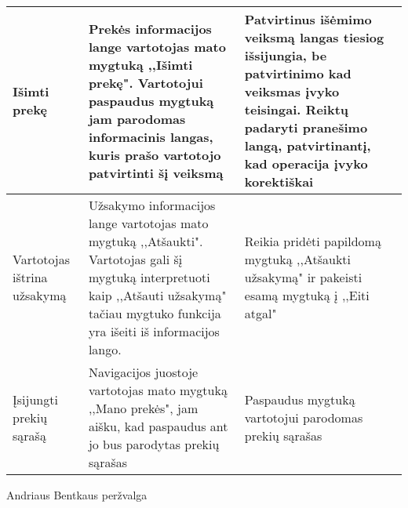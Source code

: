 \documentclass[oneside]{VUMIFPSkursinis}
\begin{document}
\begin{center}
    \begin{tabular}{ |p{4cm}| p{6cm} | p{7cm} | }
    \hline

	Išimti prekę & Prekės informacijos lange vartotojas mato mygtuką ,,Išimti prekę". Vartotojui paspaudus mygtuką jam parodomas informacinis langas, kuris prašo vartotojo patvirtinti šį veiksmą & Patvirtinus išėmimo veiksmą langas tiesiog išsijungia, be patvirtinimo kad veiksmas įvyko teisingai. Reiktų padaryti pranešimo langą, patvirtinantį, kad operacija įvyko korektiškai \\ \hline
	Vartotojas ištrina užsakymą & Užsakymo informacijos lange vartotojas mato mygtuką ,,Atšaukti". Vartotojas gali šį mygtuką interpretuoti kaip ,,Atšauti užsakymą" tačiau mygtuko funkcija yra išeiti iš informacijos lango.&
	Reikia pridėti papildomą mygtuką ,,Atšaukti užsakymą" ir pakeisti esamą mygtuką į ,,Eiti atgal" \\ \hline
	Įsijungti prekių sąrašą & Navigacijos juostoje vartotojas mato mygtuką ,,Mano prekės", jam aišku, kad paspaudus ant jo bus parodytas prekių sąrašas & Paspaudus mygtuką vartotojui parodomas prekių sąrašas \\ \hline
   \hline
    \end{tabular}
\end{center}
\pagebreak
Andriaus Bentkaus peržvalga
\end{document}
